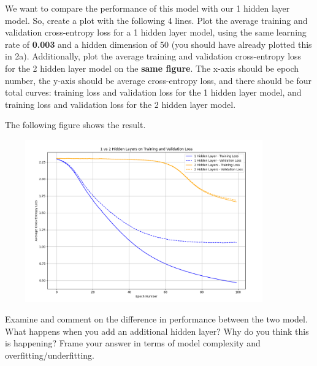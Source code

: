 \documentclass[11pt,addpoints,answers]{exam}
\begin{document}
\begin{questions}
\begin{parts}
\begin{subparts}
We want to compare the performance of this model with our 1 hidden layer model. So, create a plot with the following 4 lines. Plot the average training and validation cross-entropy loss for a 1 hidden layer model, using the same learning rate of \textbf{0.003} and a hidden dimension of 50 (you should have already plotted this in 2a). Additionally, plot the average training and validation cross-entropy loss for the 2 hidden layer model on the \textbf{same figure}. The x-axis should be epoch number, the y-axis should be average cross-entropy loss, and there should be four total curves: training loss and validation loss for the 1 hidden layer model, and training loss and validation loss for the 2 hidden layer model.


\begin{your_solution}[title=Avg. Train + Validation Cross-Entropy Loss for 1 Hidden Layer and 2 Hidden Layers,height=9cm,width=14.5cm]
The following figure shows the result.
\newline
\begin{minipage}{1\linewidth}
	\centering
	\includegraphics[width=12cm, height=7cm]{../Q3_4_res.png}
	\label{fig:Q3_4_res}         %
\end{minipage}
\end{your_solution}

\subpart[1] Examine and comment on the difference in performance between the two model. What happens when you add an additional hidden layer? Why do you think this is happening? Frame your answer in terms of model complexity and overfitting/underfitting.


\end{subparts}
\end{parts}
\end{questions}
\end{document}
